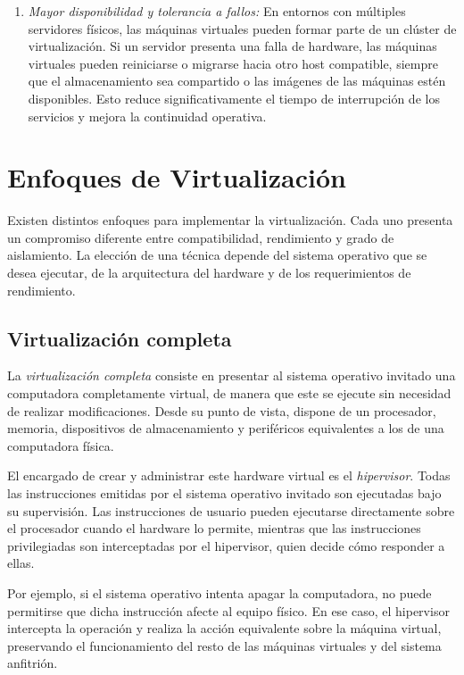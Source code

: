\begin{enumerate}
  \item \textit{Mayor disponibilidad y tolerancia a fallos:} En entornos con múltiples servidores físicos, las máquinas virtuales pueden formar parte de un clúster de virtualización. Si un servidor presenta una falla de hardware, las máquinas virtuales pueden reiniciarse o migrarse hacia otro host compatible, siempre que el almacenamiento sea compartido o las imágenes de las máquinas estén disponibles. Esto reduce significativamente el tiempo de interrupción de los servicios y mejora la continuidad operativa.
\end{enumerate}

\section{Enfoques de Virtualización}

Existen distintos enfoques para implementar la virtualización. Cada uno presenta un compromiso diferente entre compatibilidad, rendimiento y grado de aislamiento. La elección de una técnica depende del sistema operativo que se desea ejecutar, de la arquitectura del hardware y de los requerimientos de rendimiento.

\subsection{Virtualización completa}

La \textit{virtualización completa} consiste en presentar al sistema operativo invitado una computadora completamente virtual, de manera que este se ejecute sin necesidad de realizar modificaciones. Desde su punto de vista, dispone de un procesador, memoria, dispositivos de almacenamiento y periféricos equivalentes a los de una computadora física.

El encargado de crear y administrar este hardware virtual es el \textit{hipervisor}. Todas las instrucciones emitidas por el sistema operativo invitado son ejecutadas bajo su supervisión. Las instrucciones de usuario pueden ejecutarse directamente sobre el procesador cuando el hardware lo permite, mientras que las instrucciones privilegiadas son interceptadas por el hipervisor, quien decide cómo responder a ellas.

Por ejemplo, si el sistema operativo intenta apagar la computadora, no puede permitirse que dicha instrucción afecte al equipo físico. En ese caso, el hipervisor intercepta la operación y realiza la acción equivalente sobre la máquina virtual, preservando el funcionamiento del resto de las máquinas virtuales y del sistema anfitrión.

